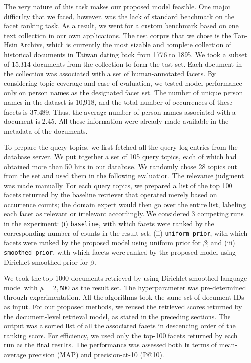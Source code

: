 The very nature of this task makes our proposed model feasible.  One major
difficulty that we faced, however, was the lack of standard benchmark on the
facet ranking task.  As a result, we went for a custom benchmark based on one
text collection in our own applications.  The test corpus that we chose is the
Tan-Hsin Archive, which is currently the most sizable and
complete collection of historical documents in Taiwan dating back from 1776 to
1895.  We took a subset of 15,314 documents from the collection to form the
test set.  Each document in the collection was associated with a set of
human-annotated facets.  By considering topic coverage and ease of evaluation,
we tested model performance only on person names as the designated facet set.
The number of unique person names in the dataset is 10,918, and the total
number of occurrences of these facets is 37,489.  Thus, the average number of
person names associated with a document is 2.45.  All these information were
already made available in the metadata of the documents.  

To prepare the query topics, we first fetched all the query log entries from
the database server.  We put together a set of 105 query topics, each of which
had obtained more than 50 hits in our database.  We randomly chose 28 topics
out from the set and used them in the following evaluation.  The relevance
judgment was made manually.  For each query topics, we prepared a list of
the top 100 facets returned by the baseline retriever that operated merely
based on occurrence counts; the domain expert would then go over the entire
list, labeling each facet as relevant or irrelevant accordingly.
We considered 3 competing runs in the experiment: (i) {\tt baseline}, with
which facets were ranked by the corresponding number of counts in the result
set; (ii) {\tt uniform-prior}, with which facets were ranked by the proposed
model using uniform prior for $\beta$; and (iii) {\tt smoothed-prior}, with
which facets were ranked by the proposed model using Dirichlet-smoothed prior
for $\beta$. 

We took the top-1000 documents retrieved by using Dirichlet-smoothed language
model with $\mu = 2,500$ as the result set.  The hyperparameter was
pre-determined through experimentation.  All the algorithms took the same set
of document IDs as input.  For our proposed methods, we reused the retrieved
scores returned by the document-level retrieval model, as stated in the
preceding sections.  The output was a sorted list of all the associated facets
in descending order of the ranking score.  For efficiency, we used only the
top-100 facets returned by each run as the final results.  The performance was
assessed both in terms of mean-average precision (MAP) and precision-at-10
(P@10).  


